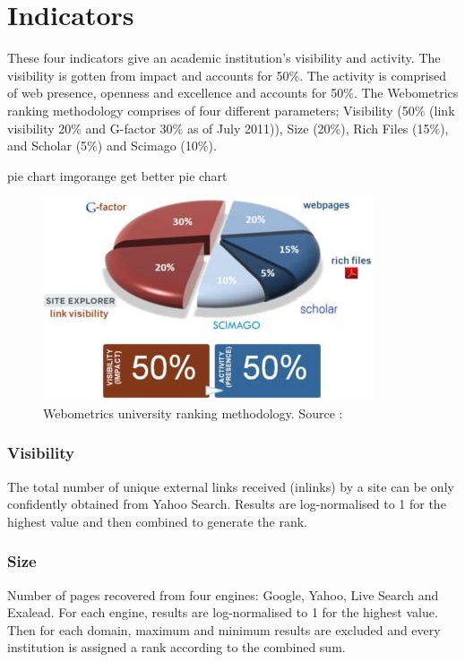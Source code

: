\section{Indicators}
These four indicators give an academic institution’s visibility and activity. The visibility is gotten from impact and accounts for 50\%. The activity is comprised of web presence, openness and excellence and accounts for 50\%. The Webometrics ranking methodology comprises of four different parameters; Visibility (50\% (link visibility 20\% and G-factor 30\% as of July 2011)), Size (20\%), Rich Files (15\%), and Scholar (5\%) and Scimago (10\%).
\begin {review_comment}{pie chart img}{orange}
{get better pie chart}
\end{review_comment}
\begin{figure}
	\includegraphics[width=\linewidth,scale=0.5]{../static/img/analysis_model.jpg}
	\caption{Webometrics university ranking methodology. Source :}
\end{figure}
\subsubsection{Visibility}
The total number of unique external links received (inlinks) by a site can be only confidently obtained from Yahoo Search. Results are log-normalised to 1 for the highest value and
then combined to generate the rank.
\subsubsection{Size}
Number of pages recovered from four engines: Google, Yahoo, Live Search and Exalead. For each engine, results are log-normalised to 1 for the highest value. Then for each domain, maximum
and minimum results are excluded and every institution is assigned a rank according to the combined sum.
